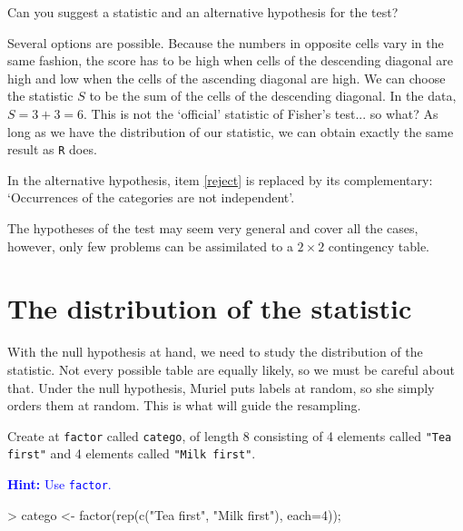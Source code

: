 \documentclass[a4paper]{article}
\theoremstyle{definition}
\begin{document}
\begin{Exercise}
Can you suggest a statistic and an alternative hypothesis for the test?
\end{Exercise}
\begin{Answer}
Several options are possible. Because the numbers in opposite cells
vary in the same fashion, the score has to be high when cells of the
descending diagonal are high and low when the cells of the ascending
diagonal are high. We can choose the statistic $S$ to be the sum
of the cells of the descending diagonal. In the data, $S = 3 + 3 = 6$.
This is not the `official' statistic of Fisher's test... so what?
As long as we have the distribution of our statistic, we can obtain
exactly the same result as \texttt{R} does.

In the alternative hypothesis, item \ref{reject} is replaced by its
complementary: `Occurrences of the categories are not independent'.

The hypotheses of the test may seem very general and cover all the
cases, however, only few problems can be assimilated to a $2\times 2$
contingency table.
\end{Answer}


\section{The distribution of the statistic}

With the null hypothesis at hand, we need to study the distribution 
of the statistic. Not every possible table are equally likely, so
we must be careful about that. Under the null hypothesis, Muriel
puts labels at random, so she simply orders them at random. This
is what will guide the resampling.

\begin{Exercise}
Create at \texttt{factor} called \texttt{catego}, of length 8 consisting
of 4 elements called \texttt{"Tea first"} and 4 elements called
\texttt{"Milk first"}.
\par\noindent\textcolor{Blue}{\textbf{Hint:} Use \texttt{factor}.}
\end{Exercise}
\begin{Answer}
\begin{Schunk}
\begin{Sinput}
> catego <- factor(rep(c("Tea first", "Milk first"), each=4));
\end{Sinput}
\end{Schunk}
\end{Answer}
\end{document}
